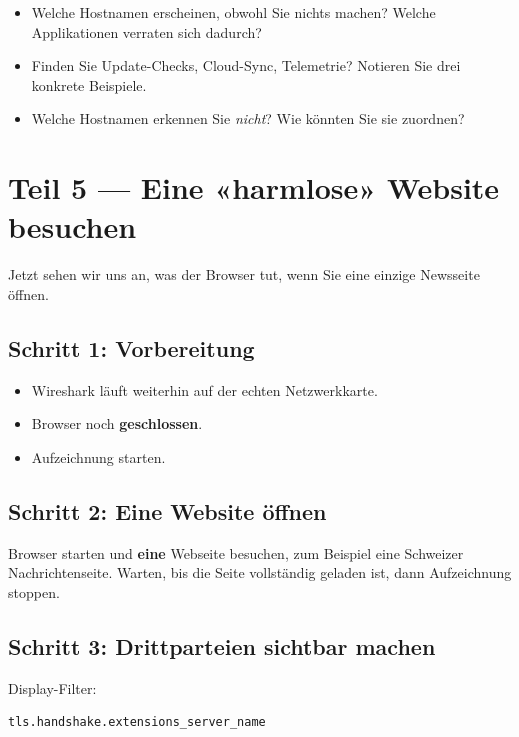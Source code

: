 \documentclass[
  nswissgerman,
  a4paper,
  DIV=11,
  numbers=noendperiod,
  ngerman]{scrreprt}
\providecommand{\tightlist}{%
  \setlength{\itemsep}{0pt}\setlength{\parskip}{0pt}}
\begin{document}
\begin{itemize}
\tightlist
\item
  Welche Hostnamen erscheinen, obwohl Sie nichts machen? Welche
  Applikationen verraten sich dadurch?
\item
  Finden Sie Update-Checks, Cloud-Sync, Telemetrie? Notieren Sie drei
  konkrete Beispiele.
\item
  Welche Hostnamen erkennen Sie \emph{nicht}? Wie könnten Sie sie
  zuordnen?
\end{itemize}

\section{Teil 5 --- Eine «harmlose» Website
besuchen}\label{teil-5-eine-harmlose-website-besuchen}

Jetzt sehen wir uns an, was der Browser tut, wenn Sie eine einzige
Newsseite öffnen.

\subsection{Schritt 1: Vorbereitung}\label{schritt-1-vorbereitung-1}

\begin{itemize}
\tightlist
\item
  Wireshark läuft weiterhin auf der echten Netzwerkkarte.
\item
  Browser noch \textbf{geschlossen}.
\item
  Aufzeichnung starten.
\end{itemize}

\subsection{Schritt 2: Eine Website
öffnen}\label{schritt-2-eine-website-uxf6ffnen}

Browser starten und \textbf{eine} Webseite besuchen, zum Beispiel eine
Schweizer Nachrichtenseite. Warten, bis die Seite vollständig geladen
ist, dann Aufzeichnung stoppen.

\subsection{Schritt 3: Drittparteien sichtbar
machen}\label{schritt-3-drittparteien-sichtbar-machen}

Display-Filter:

\begin{verbatim}
tls.handshake.extensions_server_name
\end{verbatim}
\end{document}
